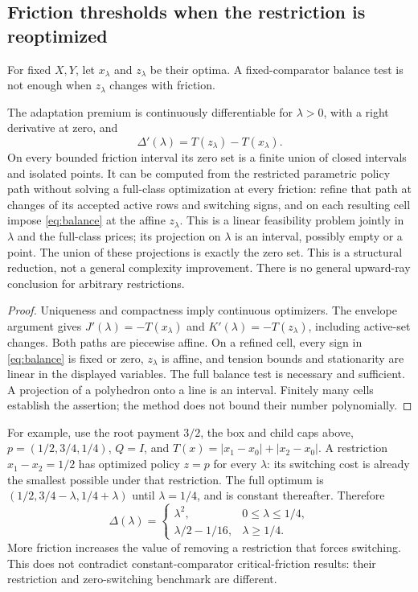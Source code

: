 \subsection{Friction thresholds when the restriction is reoptimized}
For fixed $X,Y$, let $x_\lambda$ and $z_\lambda$ be their optima. A fixed-comparator balance test is not enough when $z_\lambda$ changes with friction.
\begin{proposition}\label{prop:friction}
The adaptation premium is continuously differentiable for $\lambda>0$, with a right derivative at zero, and
\begin{equation}\label{eq:friction}
 \Delta'(\lambda)=T(z_\lambda)-T(x_\lambda).
\end{equation}
On every bounded friction interval its zero set is a finite union of closed intervals and isolated points. It can be computed from the restricted parametric policy path without solving a full-class optimization at every friction: refine that path at changes of its accepted active rows and switching signs, and on each resulting cell impose \eqref{eq:balance} at the affine $z_\lambda$. This is a linear feasibility problem jointly in $\lambda$ and the full-class prices; its projection on $\lambda$ is an interval, possibly empty or a point. The union of these projections is exactly the zero set. This is a structural reduction, not a general complexity improvement. There is no general upward-ray conclusion for arbitrary restrictions.
\end{proposition}
\begin{proof}
Uniqueness and compactness imply continuous optimizers. The envelope argument gives $J'(\lambda)=-T(x_\lambda)$ and $K'(\lambda)=-T(z_\lambda)$, including active-set changes. Both paths are piecewise affine. On a refined cell, every sign in \eqref{eq:balance} is fixed or zero, $z_\lambda$ is affine, and tension bounds and stationarity are linear in the displayed variables. The full balance test is necessary and sufficient. A projection of a polyhedron onto a line is an interval. Finitely many cells establish the assertion; the method does not bound their number polynomially.\end{proof}

For example, use the root payment $3/2$, the box and child caps above, $p=(1/2,3/4,1/4)$, $Q=I$, and $T(x)=|x_1-x_0|+|x_2-x_0|$. A restriction $x_1-x_2=1/2$ has optimized policy $z=p$ for every $\lambda$: its switching cost is already the smallest possible under that restriction. The full optimum is $(1/2,3/4-\lambda,1/4+\lambda)$ until $\lambda=1/4$, and is constant thereafter. Therefore
\begin{equation}\label{eq:friction-example}
 \Delta(\lambda)=\begin{cases}\lambda^2,&0\leq\lambda\leq1/4,\\
 \lambda/2-1/16,&\lambda\geq1/4.
 \end{cases}
\end{equation}
More friction increases the value of removing a restriction that forces switching. This does not contradict constant-comparator critical-friction results: their restriction and zero-switching benchmark are different.

